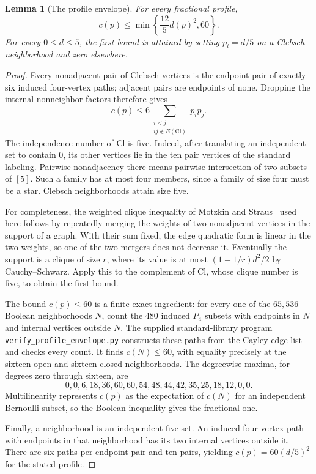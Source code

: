 \documentclass[11pt]{amsart}
\newtheorem{lemma}[theorem]{Lemma}
\theoremstyle{definition}
\theoremstyle{remark}
\begin{document}
\begin{lemma}[The profile envelope]\label{lem:profile-envelope}
For every fractional profile,
\[
 c(p)\leq\min\left\{\frac{12}{5}d(p)^2,60\right\}.
\]
For every $0\leq d\leq5$, the first bound is attained by setting
$p_i=d/5$ on a Clebsch neighborhood and zero elsewhere.
\end{lemma}
\begin{proof}
Every nonadjacent pair of Clebsch vertices is the endpoint pair of exactly
six induced four-vertex paths; adjacent pairs are endpoints of none.
Dropping the internal nonneighbor factors therefore gives
\[
 c(p)\leq6\sum_{\substack{i<j\\ij\notin E(\mathrm{Cl})}}p_i p_j.
\]
The independence number of $\mathrm{Cl}$ is five. Indeed, after translating
an independent set to contain $0$, its other vertices lie in the ten pair
vertices of the standard labeling. Pairwise nonadjacency there means
pairwise intersection of two-subsets of $[5]$. Such a family has at most
four members, since a family of size four must be a star. Clebsch
neighborhoods attain size five.

For completeness, the weighted clique inequality of Motzkin and
Straus~\cite{MotzkinStraus1965} used here follows by repeatedly merging the
weights of two nonadjacent vertices in the support of a graph. With their
sum fixed, the edge quadratic form is linear in the two weights, so one
of the two mergers does not decrease it. Eventually the support is a
clique of size $r$, where its value is at most $(1-1/r)d^2/2$ by
Cauchy--Schwarz. Apply this to the complement of $\mathrm{Cl}$, whose
clique number is five, to obtain the first bound.

The bound $c(p)\leq60$ is a finite exact ingredient: for every one of the
$65,536$ Boolean neighborhoods $N$, count the $480$ induced $P_4$ subsets
with endpoints in $N$ and internal vertices outside $N$. The supplied
standard-library program \texttt{verify\_profile\_envelope.py} constructs
these paths from the Cayley edge list and checks every count. It finds
$c(N)\leq60$, with equality precisely at the sixteen open and sixteen
closed neighborhoods. The degreewise maxima, for degrees zero through
sixteen, are
\[
 0,0,6,18,36,60,60,54,48,44,42,35,25,18,12,0,0.
\]
Multilinearity represents $c(p)$ as the expectation of $c(N)$ for an
independent Bernoulli subset, so the Boolean inequality gives the
fractional one.

Finally, a neighborhood is an independent five-set. An induced
four-vertex path with endpoints in that neighborhood has its two internal
vertices outside it. There are six paths per endpoint pair and ten pairs,
yielding $c(p)=60(d/5)^2$ for the stated profile.
\end{proof}
\end{document}
